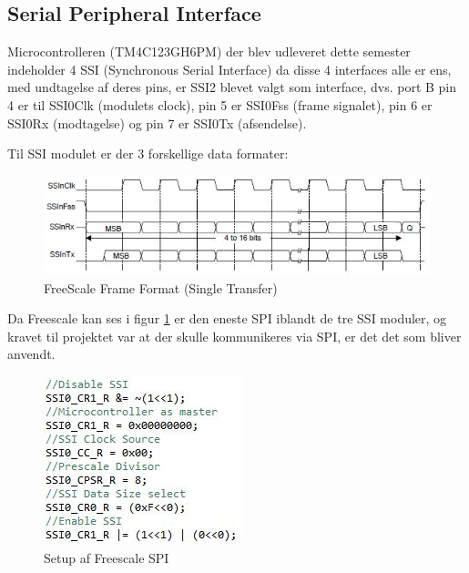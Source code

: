 \subsection{Serial Peripheral Interface}
\label{subsec:SPI}

Microcontrolleren (TM4C123GH6PM) der blev udleveret dette semester  indeholder 4 SSI (Synchronous Serial Interface) da disse 4 interfaces alle er ens, med undtagelse af deres pins, er SSI2 blevet valgt som interface, dvs. port B pin 4 er til SSI0Clk (modulets clock), pin 5 er SSI0Fss (frame signalet), pin 6 er SSI0Rx (modtagelse) og pin 7 er SSI0Tx (afsendelse).

Til SSI modulet er der 3 forskellige data formater:

		\begin{figure}[ht]
			\begin{center}
			\includegraphics[scale=1]{Billeder/FS_Frame_Format.JPG}
			\end{center}
			\caption{FreeScale Frame Format (Single Transfer)}
			\label{fig:FSFrameFormat}
		\end{figure}
	
Da Freescale kan ses i figur \ref{fig:FSFrameFormat} er den eneste SPI iblandt de tre SSI moduler, og kravet til projektet var at der skulle kommunikeres via SPI, er det det som bliver anvendt.

		\begin{figure}[ht]
			\begin{center}
			\includegraphics[scale=0.8]{Billeder/SPI_Setup.JPG}
			\end{center}
			\caption{Setup af Freescale SPI}
			\label{fig:SPI_Setup}
		\end{figure}

